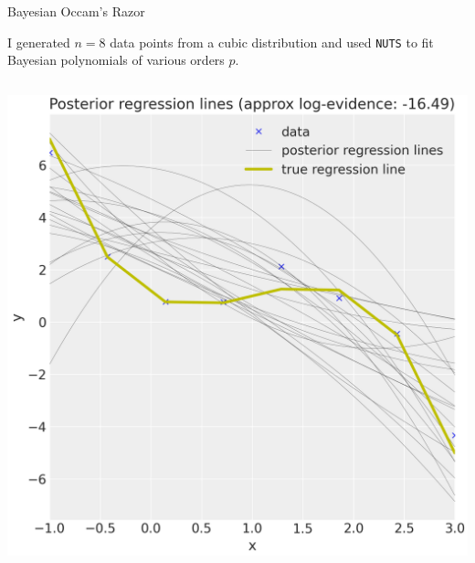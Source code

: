 \documentclass[10pt]{beamer}
\begin{document}
\begin{frame}{Bayesian Occam's Razor}

{\scriptsize I generated $n=8$ data points from a \alert{cubic} distribution and used \texttt{NUTS} to fit Bayesian polynomials of various orders $p$.}

\vfill
    \begin{columns}
        \begin{column}{0.33\textwidth}
            \includegraphics[width=\columnwidth]{images/bayesian_regression_quadratic_model}%
            

\end{column}
\end{columns}
\end{frame}
\end{document}
